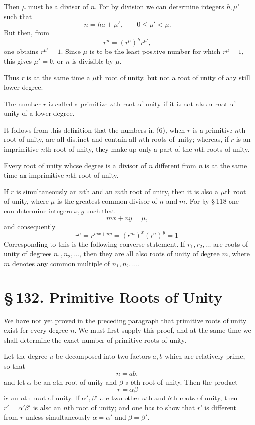 \documentclass[11pt]{article}
\providecommand{\sect}[2]{\section*{\S\,#1. #2}}
\begin{document}
Then $\mu$ must be a divisor of $n$. For by division we can determine integers $h,\mu'$ such that
\[
        n=h\mu+\mu',\qquad 0\le \mu'<\mu.
\]
But then, from
\[
        r^n=(r^\mu)^h r^{\mu'},
\]
one obtains $r^{\mu'}=1$. Since $\mu$ is to be the least positive number for which $r^\mu=1$, this gives $\mu'=0$, or $n$ is divisible by $\mu$.

Thus $r$ is at the same time a $\mu$th root of unity, but not a root of unity of any still lower degree.

The number $r$ is called a primitive $n$th root of unity if it is not also a root of unity of a lower degree.

It follows from this definition that the numbers in (6), when $r$ is a primitive $n$th root of unity, are all distinct and contain all $n$th roots of unity; whereas, if $r$ is an imprimitive $n$th root of unity, they make up only a part of the $n$th roots of unity.

Every root of unity whose degree is a divisor of $n$ different from $n$ is at the same time an imprimitive $n$th root of unity.

If $r$ is simultaneously an $n$th and an $m$th root of unity, then it is also a $\mu$th root of unity, where $\mu$ is the greatest common divisor of $n$ and $m$. For by \S\,118 one can determine integers $x,y$ such that
\[
        mx+ny=\mu,
\]
and consequently
\[
        r^\mu=r^{mx+ny}=(r^m)^x(r^n)^y=1.
\]
Corresponding to this is the following converse statement. If $r_1,r_2,\ldots$ are roots of unity of degrees $n_1,n_2,\ldots$, then they are all also roots of unity of degree $m$, where $m$ denotes any common multiple of $n_1,n_2,\ldots$.

\sect{132}{Primitive Roots of Unity}

We have not yet proved in the preceding paragraph that primitive roots of unity exist for every degree $n$. We must first supply this proof, and at the same time we shall determine the exact number of primitive roots of unity.

Let the degree $n$ be decomposed into two factors $a,b$ which are relatively prime, so that
\[
        n=ab,
\]
and let $\alpha$ be an $a$th root of unity and $\beta$ a $b$th root of unity. Then the product
\[
\tag{1}        r=\alpha\beta
\]
is an $n$th root of unity. If $\alpha',\beta'$ are two other $a$th and $b$th roots of unity, then $r'=\alpha'\beta'$ is also an $n$th root of unity; and one has to show that $r'$ is different from $r$ unless simultaneously $\alpha=\alpha'$ and $\beta=\beta'$.
\end{document}
